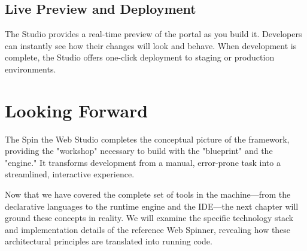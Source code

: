 \subsection{Live Preview and Deployment}
The Studio provides a real-time preview of the portal as you build it. Developers can instantly see how their changes will look and behave. When development is complete, the Studio offers one-click deployment to staging or production environments.

\section{Looking Forward}
\label{sec:studio-forward}

The Spin the Web Studio completes the conceptual picture of the framework, providing the "workshop" necessary to build with the "blueprint" and the "engine." It transforms \webbase{} development from a manual, error-prone task into a streamlined, interactive experience.

Now that we have covered the complete set of tools in the machine—from the declarative languages to the runtime engine and the IDE—the next chapter will ground these concepts in reality. We will examine the specific technology stack and implementation details of the reference Web Spinner, revealing how these architectural principles are translated into running code.
